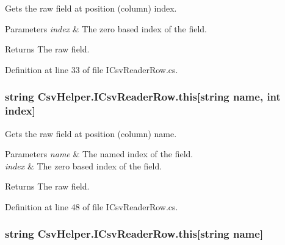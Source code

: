 Gets the raw field at position (column) index. 


\begin{DoxyParams}{Parameters}
{\em index} & The zero based index of the field.\\
\hline
\end{DoxyParams}
\begin{DoxyReturn}{Returns}
The raw field.
\end{DoxyReturn}


Definition at line 33 of file I\-Csv\-Reader\-Row.\-cs.

\hypertarget{a00117_abe611a2c471e6f11da579297bb876fb1}{
\subsubsection[{this[string name, int index]}]{\setlength{\rightskip}{0pt plus 5cm}string Csv\-Helper.\-I\-Csv\-Reader\-Row.\-this\mbox{[}string name, int index\mbox{]}\hspace{0.3cm}{\ttfamily [get]}}}\label{a00117_abe611a2c471e6f11da579297bb876fb1}


Gets the raw field at position (column) name. 


\begin{DoxyParams}{Parameters}
{\em name} & The named index of the field.\\
\hline
{\em index} & The zero based index of the field.\\
\hline
\end{DoxyParams}
\begin{DoxyReturn}{Returns}
The raw field.
\end{DoxyReturn}


Definition at line 48 of file I\-Csv\-Reader\-Row.\-cs.

\hypertarget{a00117_a999cf88bd8eb0b59c65b235cfe0e2835}{
\subsubsection[{this[string name]}]{\setlength{\rightskip}{0pt plus 5cm}string Csv\-Helper.\-I\-Csv\-Reader\-Row.\-this\mbox{[}string name\mbox{]}\hspace{0.3cm}{\ttfamily [get]}}}\label{a00117_a999cf88bd8eb0b59c65b235cfe0e2835}


